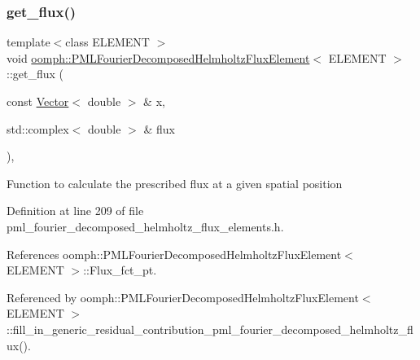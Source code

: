 \mbox{\label{classoomph_1_1PMLFourierDecomposedHelmholtzFluxElement_ac4d3e3702156481651c49e1a1241f0bc}} 
\subsubsection{\texorpdfstring{get\+\_\+flux()}{get\_flux()}}
{\footnotesize\ttfamily template$<$class E\+L\+E\+M\+E\+NT $>$ \\
void \hyperlink{classoomph_1_1PMLFourierDecomposedHelmholtzFluxElement}{oomph\+::\+P\+M\+L\+Fourier\+Decomposed\+Helmholtz\+Flux\+Element}$<$ E\+L\+E\+M\+E\+NT $>$\+::get\+\_\+flux (\begin{DoxyParamCaption}\item[{const \hyperlink{classoomph_1_1Vector}{Vector}$<$ double $>$ \&}]{x,  }\item[{std\+::complex$<$ double $>$ \&}]{flux }\end{DoxyParamCaption})\hspace{0.3cm}{\ttfamily [inline]}, {\ttfamily [protected]}}

Function to calculate the prescribed flux at a given spatial position 

Definition at line 209 of file pml\+\_\+fourier\+\_\+decomposed\+\_\+helmholtz\+\_\+flux\+\_\+elements.\+h.



References oomph\+::\+P\+M\+L\+Fourier\+Decomposed\+Helmholtz\+Flux\+Element$<$ E\+L\+E\+M\+E\+N\+T $>$\+::\+Flux\+\_\+fct\+\_\+pt.



Referenced by oomph\+::\+P\+M\+L\+Fourier\+Decomposed\+Helmholtz\+Flux\+Element$<$ E\+L\+E\+M\+E\+N\+T $>$\+::fill\+\_\+in\+\_\+generic\+\_\+residual\+\_\+contribution\+\_\+pml\+\_\+fourier\+\_\+decomposed\+\_\+helmholtz\+\_\+flux().

\mbox{\label{classoomph_1_1PMLFourierDecomposedHelmholtzFluxElement_a88de9165ecb2201d50cf5dc7c33f1ec3}} 
